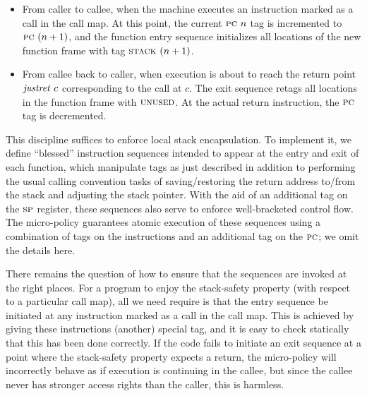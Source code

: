 \documentclass[acmsmall,review,anonymous]{acmart}\settopmatter{printfolios=true,printccs=false,printacmref=false}
\newcommand*{\rsp}{\textsc{sp}}
\begin{document}
\begin{itemize}

\item From caller to callee, when the machine executes an instruction marked as a call in
  the call map.
  At this point, the current
  $\textsc{pc} ~ n$ tag is incremented to $\textsc{pc} ~ (n + 1)$, and the function
  entry sequence initializes  all locations of the new function frame with
  tag $\textsc{stack} ~ (n + 1)$.

\item From callee back to caller, when execution is about to reach the return point
  $\mathit{justret}\ c$
  corresponding to the call at $c$.  The exit sequence retags all locations in the function
  frame with $\textsc{unused}$. At the actual return instruction, the
  $\textsc{pc}$ tag is decremented.

\end{itemize}

This discipline suffices to enforce local stack encapsulation.
To implement it,  we define ``blessed'' instruction sequences
intended to appear at the entry and exit of each function,
which manipulate tags as just described in addition to performing the
usual calling convention tasks of saving/restoring the return address to/from
the stack and adjusting the stack pointer. With the aid of an additional tag on
the $\rsp$ register, these sequences also serve to enforce
well-bracketed control flow.
The micro-policy guarantees atomic execution of these sequences
using a combination of tags on the instructions
and an additional tag on the $\textsc{pc}$; we omit the details here.

There remains the question of how to ensure that the sequences are
invoked at the right places. For a program to enjoy the stack-safety property
(with respect to a particular call map), all we need require is that
the entry sequence be initiated at any instruction marked as a call
in the call map. This is achieved by giving these instructions (another) special tag,
and it is easy to check statically that this has been done correctly.
If the code fails to initiate an exit
sequence at a point where the stack-safety property expects a return,
the micro-policy will incorrectly behave as if execution
is continuing in the callee, but since the callee never has stronger access
rights than the caller, this is harmless.
\end{document}
